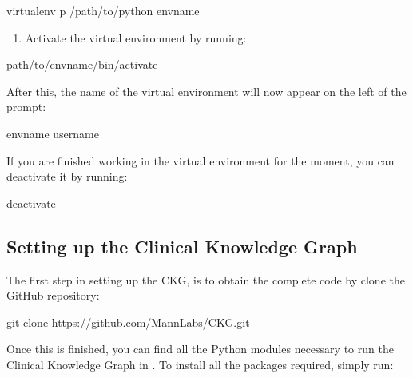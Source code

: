 \documentclass[letterpaper,10pt,english]{sphinxmanual}
\begin{document}
\begin{sphinxVerbatim}[commandchars=\\\{\}]
\PYGZdl{} virtualenv \PYGZhy{}p /path/to/python env\PYGZus{}name
\end{sphinxVerbatim}
\begin{enumerate}
%
\item {} 
Activate the virtual environment by running:

\end{enumerate}

\begin{sphinxVerbatim}[commandchars=\\\{\}]
\PYGZdl{}  path/to/env\PYGZus{}name/bin/activate
\end{sphinxVerbatim}

After this, the name of the virtual environment will now appear on the left of the prompt:

\begin{sphinxVerbatim}[commandchars=\\\{\}]
env\PYGZus{}name username\PYGZdl{}
\end{sphinxVerbatim}

If you are finished working in the virtual environment for the moment, you can deactivate it by running:

\begin{sphinxVerbatim}[commandchars=\\\{\}]
\PYGZdl{} deactivate
\end{sphinxVerbatim}


\subsection{Setting up the Clinical Knowledge Graph}
\label{\detokenize{intro/getting-started-with-build:setting-up-the-clinical-knowledge-graph}}
The first step in setting up the CKG, is to obtain the complete code by clone the GitHub repository:

\begin{sphinxVerbatim}[commandchars=\\\{\}]
\PYGZdl{} git clone https://github.com/MannLabs/CKG.git
\end{sphinxVerbatim}

Once this is finished, you can find all the Python modules necessary to run the Clinical Knowledge Graph in .
To install all the packages required, simply run:
\end{document}
